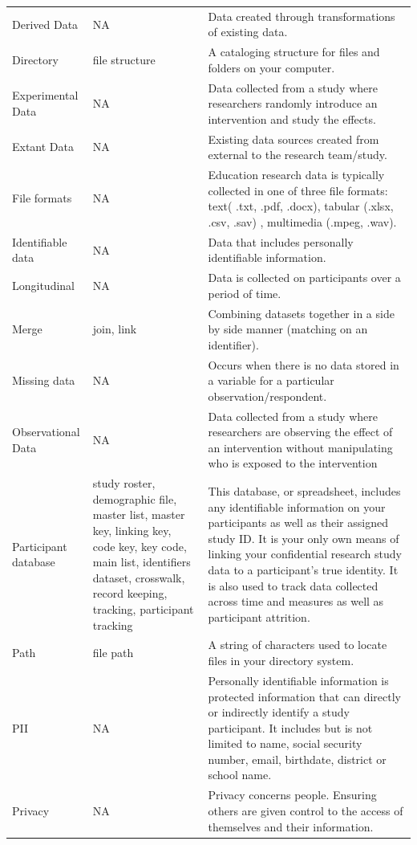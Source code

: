 \documentclass[
]{book}
\begin{document}
\begin{longtable}{lll}
Derived Data & NA & Data created through transformations of existing data. \\ 
Directory & file structure & A cataloging structure for files and folders on your computer. \\ 
Experimental Data & NA & Data collected from a study where researchers randomly introduce an intervention and study the effects. \\ 
Extant Data & NA & Existing data sources created from external to the research team/study. \\ 
File formats & NA & Education research data is typically collected in one of three file formats: text( .txt, .pdf, .docx), tabular (.xlsx, .csv, .sav) , multimedia (.mpeg, .wav). \\ 
Identifiable data & NA & Data that includes personally identifiable information. \\ 
Longitudinal & NA & Data is collected on participants over a period of time. \\ 
Merge & join, link & Combining datasets together in a side by side manner (matching on an identifier). \\ 
Missing data & NA & Occurs when there is no data stored in a variable for a particular observation/respondent. \\ 
Observational Data & NA & Data collected from a study where researchers are observing the effect of an intervention without manipulating who is exposed to the intervention \\ 
Participant database & study roster, demographic file, master list, master key, linking key, code key, key code, main list, identifiers dataset, crosswalk, record keeping, tracking, participant tracking & This database, or spreadsheet, includes any identifiable information on your participants as well as their assigned study ID. It is your only own means of linking your confidential research study data to a participant’s true identity. It is also used to track data collected across time and measures as well as participant attrition. \\ 
Path & file path & A string of characters used to locate files in your directory system. \\ 
PII & NA & Personally identifiable information is protected information that can directly or indirectly identify a study participant. It includes but is not limited to name, social security number, email, birthdate, district or school name. \\ 
Privacy & NA & Privacy concerns people. Ensuring others are given control to the access of themselves and their information. \\ 

\end{longtable}
\end{document}
